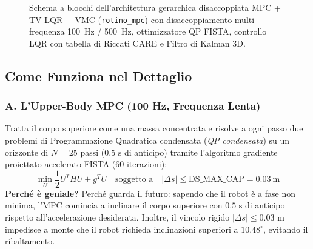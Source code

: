 \documentclass[11pt,a4paper]{article}
\begin{document}
\begin{figure}[htbp]
{
}
\caption{Schema a blocchi dell'architettura gerarchica disaccoppiata MPC + TV-LQR + VMC (\texttt{rotino\_mpc}) con disaccoppiamento multi-frequenza 100~Hz / 500~Hz, ottimizzatore QP FISTA, controllo LQR con tabella di Riccati CARE e Filtro di Kalman 3D.}
\label{fig:block_mpc}
\end{figure}

\subsection{Come Funziona nel Dettaglio}

\subsubsection{A. L'Upper-Body MPC (100 Hz, Frequenza Lenta)}
Tratta il corpo superiore come una massa concentrata e risolve a ogni passo due problemi di Programmazione Quadratica condensata (\textit{QP condensata}) su un orizzonte di $N = 25$ passi ($0.5\text{ s}$ di anticipo) tramite l'algoritmo gradiente proiettato accelerato FISTA (60 iterazioni):
\begin{equation}
\min_U \frac{1}{2} U^T H U + g^T U \quad \text{soggetto a} \quad |\Delta s| \le \text{DS\_MAX\_CAP} = 0.03\ \text{m}
\end{equation}
\textbf{Perché è geniale?} Perché guarda il futuro: sapendo che il robot è a fase non minima, l'MPC comincia a inclinare il corpo superiore con $0.5\text{ s}$ di anticipo rispetto all'accelerazione desiderata. Inoltre, il vincolo rigido $|\Delta s| \le 0.03\text{ m}$ impedisce a monte che il robot richieda inclinazioni superiori a $10.48^\circ$, evitando il ribaltamento.
\end{document}
